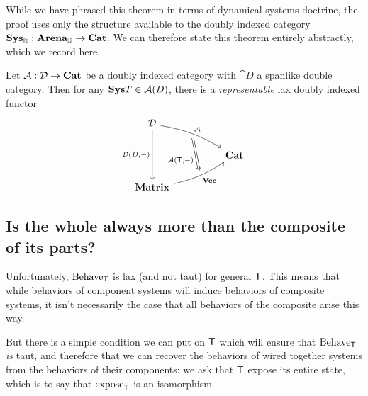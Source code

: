 \documentclass[DynamicalBook]{subfiles}
\begin{document}
While we have phrased this theorem in terms of dynamical systems doctrine, the
proof uses only the structure available to the doubly indexed category
$\textbf{Sys}_{\mathbb{D}} : \textbf{Arena}_{\mathbb{D}} \to \textbf{Cat}$. We can therefore state this
theorem entirely abstractly, which we record here.
\begin{theorem}
  Let $\mathcal{A} : \mathcal{D} \to \textbf{Cat}$ be a doubly indexed category with
  $\cat{D}$ a spanlike double category. Then for any $\textbf{Sys}{T} \in \mathcal{A}(D)$,
  there is a \emph{representable} lax doubly indexed functor
\[\begin{tikzcd}
	{\cat{D}} \\
	&& {\Cat{Cat}} \\
	{\Cat{Matrix}}
	\arrow[""{name=0, anchor=center, inner sep=0}, "{\cat{A}}", from=1-1,
  to=2-3, bend left = 10]
	\arrow[""{name=1, anchor=center, inner sep=0}, "{\Cat{Vec}}"', from=3-1,
  to=2-3, bend right = 10]
	\arrow["{\cat{D}\left(D,-\right)}"', from=1-1, to=3-1]
	\arrow["{\cat{A}(\Sys{T}, -)}"', shorten <=4pt, shorten >=4pt, Rightarrow,
  from=0, to=1]
\end{tikzcd}\]
\end{theorem}

\subsection{Is the whole always more than the composite of its parts?}
Unfortunately, $\mathrm{Behave}_{\mathsf{T}}$ is lax (and not taut) for general
$\mathsf{T}$. This means that while behaviors of component systems will induce
behaviors of composite systems, it isn't necessarily the case that all behaviors
of the composite arise this way.

But there is a simple condition we can put on $\mathsf{T}$ which will
ensure that $\mathrm{Behave}_{\mathsf{T}}$ \emph{is} taut, and therefore that we can
recover the behaviors of wired together systems from the behaviors of their
components: we ask that $\mathsf{T}$ expose its entire state, which is to say that
$\mathrm{expose}_{\mathsf{T}}$ is an isomorphism.
\end{document}
